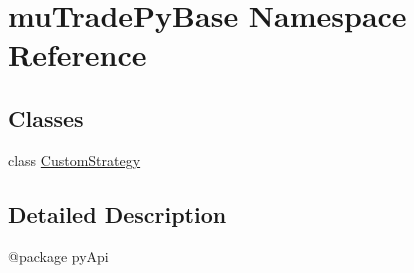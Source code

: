 \hypertarget{namespacemuTradePyBase}{
\section{muTradePyBase Namespace Reference}
\label{namespacemuTradePyBase}
}
\subsection*{Classes}
\begin{DoxyCompactItemize}
\item 
class \hyperlink{classmuTradePyBase_1_1CustomStrategy}{CustomStrategy}
\end{DoxyCompactItemize}


\subsection{Detailed Description}
\begin{DoxyVerb}@package pyApi
\end{DoxyVerb}
 